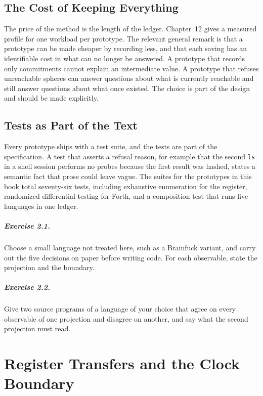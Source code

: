 \documentclass[11pt,oneside]{report}
\theoremstyle{plain}
\theoremstyle{definition}
\theoremstyle{remark}
\begin{document}
\section{The Cost of Keeping Everything}

The price of the method is the length of the ledger. Chapter~12 gives a measured profile for one workload per prototype. The relevant general remark is that a prototype can be made cheaper by recording less, and that each saving has an identifiable cost in what can no longer be answered. A prototype that records only commitments cannot explain an intermediate value. A prototype that refuses unreachable spheres can answer questions about what is currently reachable and still answer questions about what once existed. The choice is part of the design and should be made explicitly.

\section{Tests as Part of the Text}

Every prototype ships with a test suite, and the tests are part of the specification. A test that asserts a refusal reason, for example that the second \texttt{ls} in a shell session performs no probes because the first result was hashed, states a semantic fact that prose could leave vague. The suites for the prototypes in this book total seventy-six tests, including exhaustive enumeration for the register, randomized differential testing for Forth, and a composition test that runs five languages in one ledger.

\paragraph{Exercise 2.1.} Choose a small language not treated here, such as a Brainfuck variant, and carry out the five decisions on paper before writing code. For each observable, state the projection and the boundary.

\paragraph{Exercise 2.2.} Give two source programs of a language of your choice that agree on every observable of one projection and disagree on another, and say what the second projection must read.
\chapter{Register Transfers and the Clock Boundary}
\end{document}
